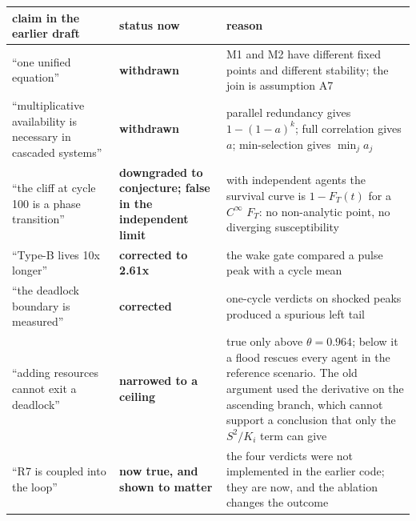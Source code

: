 \documentclass[11pt,a4paper]{article}
\newcounter{none}
\begin{document}
{\def\LTcaptype{none} %
\begin{longtable}[]{@{}
  >{\raggedright\arraybackslash}p{}
  >{\raggedright\arraybackslash}p{}
  >{\raggedright\arraybackslash}p{}@{}}
\toprule\noalign{}
\begin{minipage}[b]{\linewidth}\raggedright
claim in the earlier draft
\end{minipage} & \begin{minipage}[b]{\linewidth}\raggedright
status now
\end{minipage} & \begin{minipage}[b]{\linewidth}\raggedright
reason
\end{minipage} \\
\midrule\noalign{}
\endhead
\bottomrule\noalign{}
\endlastfoot
``one unified equation'' & \textbf{withdrawn} & M1 and M2 have different fixed points and different stability; the join is assumption A7 \\
``multiplicative availability is necessary in cascaded systems'' & \textbf{withdrawn} & parallel redundancy gives \(1-(1-a)^k\); full correlation gives \(a\); min-selection gives \(\min_j a_j\) \\
``the cliff at cycle 100 is a phase transition'' & \textbf{downgraded to conjecture; false in the independent limit} & with independent agents the survival curve is \(1-F_T(t)\) for a \(C^\infty\) \(F_T\): no non-analytic point, no diverging susceptibility \\
``Type-B lives 10x longer'' & \textbf{corrected to 2.61x} & the wake gate compared a pulse peak with a cycle mean \\
``the deadlock boundary is measured'' & \textbf{corrected} & one-cycle verdicts on shocked peaks produced a spurious left tail \\
``adding resources cannot exit a deadlock'' & \textbf{narrowed to a ceiling} & true only above \(\theta=0.964\); below it a flood rescues every agent in the reference scenario. The old argument used the derivative on the ascending branch, which cannot support a conclusion that only the \(S^2/K_i\) term can give \\
``R7 is coupled into the loop'' & \textbf{now true, and shown to matter} & the four verdicts were not implemented in the earlier code; they are now, and the ablation changes the outcome \\
\end{longtable}
}
\end{document}
